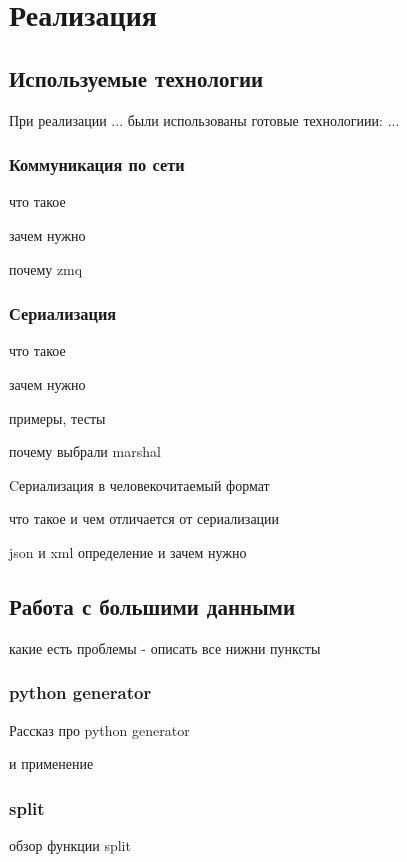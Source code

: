 \documentclass[12pt,a4paper,oneside]{extarticle}
\begin{document}
\section{Реализация}
    \subsection{Используемые технологии}
        При реализации ... были использованы готовые технологиии: ...

        \subsubsection{Коммуникация по сети}
            что такое

            зачем нужно

            почему zmq

        \subsubsection{Сериализация}
            что такое

            зачем нужно

            примеры, тесты

            почему выбрали marshal

            Cериализация в человекочитаемый формат %

            что такое и чем отличается от сериализации

            json и xml определение и зачем нужно

    \clearpage

    \subsection{Работа с большими данными}

        какие есть проблемы - описать все нижни пунксты

        \subsubsection{python generator}
            Рассказ про python generator

            и применение

        \subsubsection{split}
            обзор функции split
\end{document}
